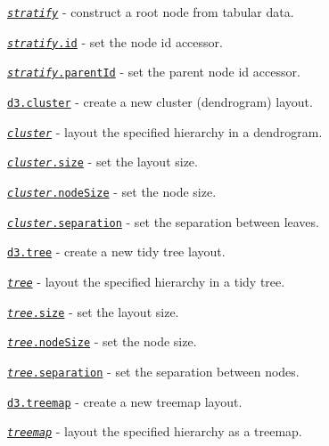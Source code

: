 \begin{DoxyItemize}
\item \href{https://github.com/d3/d3-hierarchy/blob/master/README.md#_stratify}{\tt {\itshape stratify}} -\/ construct a root node from tabular data.
\item \href{https://github.com/d3/d3-hierarchy/blob/master/README.md#stratify_id}{\tt {\itshape stratify}.id} -\/ set the node id accessor.
\item \href{https://github.com/d3/d3-hierarchy/blob/master/README.md#stratify_parentId}{\tt {\itshape stratify}.parent\+Id} -\/ set the parent node id accessor.
\item \href{https://github.com/d3/d3-hierarchy/blob/master/README.md#cluster}{\tt d3.\+cluster} -\/ create a new cluster (dendrogram) layout.
\item \href{https://github.com/d3/d3-hierarchy/blob/master/README.md#_cluster}{\tt {\itshape cluster}} -\/ layout the specified hierarchy in a dendrogram.
\item \href{https://github.com/d3/d3-hierarchy/blob/master/README.md#cluster_size}{\tt {\itshape cluster}.size} -\/ set the layout size.
\item \href{https://github.com/d3/d3-hierarchy/blob/master/README.md#cluster_nodeSize}{\tt {\itshape cluster}.node\+Size} -\/ set the node size.
\item \href{https://github.com/d3/d3-hierarchy/blob/master/README.md#cluster_separation}{\tt {\itshape cluster}.separation} -\/ set the separation between leaves.
\item \href{https://github.com/d3/d3-hierarchy/blob/master/README.md#tree}{\tt d3.\+tree} -\/ create a new tidy tree layout.
\item \href{https://github.com/d3/d3-hierarchy/blob/master/README.md#_tree}{\tt {\itshape tree}} -\/ layout the specified hierarchy in a tidy tree.
\item \href{https://github.com/d3/d3-hierarchy/blob/master/README.md#tree_size}{\tt {\itshape tree}.size} -\/ set the layout size.
\item \href{https://github.com/d3/d3-hierarchy/blob/master/README.md#tree_nodeSize}{\tt {\itshape tree}.node\+Size} -\/ set the node size.
\item \href{https://github.com/d3/d3-hierarchy/blob/master/README.md#tree_separation}{\tt {\itshape tree}.separation} -\/ set the separation between nodes.
\item \href{https://github.com/d3/d3-hierarchy/blob/master/README.md#treemap}{\tt d3.\+treemap} -\/ create a new treemap layout.
\item \href{https://github.com/d3/d3-hierarchy/blob/master/README.md#_treemap}{\tt {\itshape treemap}} -\/ layout the specified hierarchy as a treemap.

\end{DoxyItemize}
